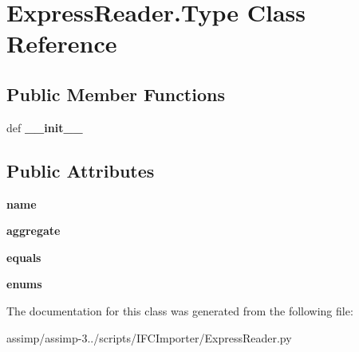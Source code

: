 \hypertarget{class_express_reader_1_1_type}{\section{Express\+Reader.\+Type Class Reference}
\label{class_express_reader_1_1_type}
}
\subsection*{Public Member Functions}
\begin{DoxyCompactItemize}
\item 
\hypertarget{class_express_reader_1_1_type_aba68451cdb606dd2a4cbce21949f17fa}{def {\bfseries \+\_\+\+\_\+init\+\_\+\+\_\+}}\label{class_express_reader_1_1_type_aba68451cdb606dd2a4cbce21949f17fa}

\end{DoxyCompactItemize}
\subsection*{Public Attributes}
\begin{DoxyCompactItemize}
\item 
\hypertarget{class_express_reader_1_1_type_a17e1e9a8428cca3be0711ecf7df31cd1}{{\bfseries name}}\label{class_express_reader_1_1_type_a17e1e9a8428cca3be0711ecf7df31cd1}

\item 
\hypertarget{class_express_reader_1_1_type_a7cf346e187cb23dc9daab99765948d50}{{\bfseries aggregate}}\label{class_express_reader_1_1_type_a7cf346e187cb23dc9daab99765948d50}

\item 
\hypertarget{class_express_reader_1_1_type_a1159a0fec4485759ed01b9630ba0bb11}{{\bfseries equals}}\label{class_express_reader_1_1_type_a1159a0fec4485759ed01b9630ba0bb11}

\item 
\hypertarget{class_express_reader_1_1_type_ac00ee105937592681656bbc4da8f28a2}{{\bfseries enums}}\label{class_express_reader_1_1_type_ac00ee105937592681656bbc4da8f28a2}

\end{DoxyCompactItemize}


The documentation for this class was generated from the following file\+:\begin{DoxyCompactItemize}
\item 
assimp/assimp-\/3../scripts/\+I\+F\+C\+Importer/Express\+Reader.\+py\end{DoxyCompactItemize}
